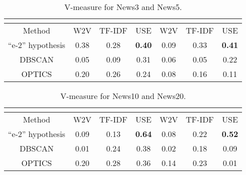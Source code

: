 \begin{table}[ht]%
	\centering
	\caption{V-measure for News3 and News5.}%
	\label{tab:vMeasure35}%
		\begin{tabular}{ c  c  c  c  c  c  c }%
			\toprule
			 & \multicolumn{3}{c}{\makecell{News3}} & \multicolumn{3}{c}{\makecell{News5}}\\
			\hline
			Method & W2V & TF-IDF & USE & W2V & TF-IDF & USE \\
			\hline
			“e-2” hypothesis & 0.38 & 0.28 & \textbf{0.40} & 0.09 & 0.33 & \textbf{0.41} \\
			DBSCAN & 0.05 & 0.09 & 0.31 & 0.06 & 0.05 & 0.22 \\
			OPTICS & 0.20 & 0.26 & 0.24 & 0.08 & 0.16 & 0.11 \\
			\bottomrule
		\end{tabular}%
\end{table}

\begin{table}[ht]%
	\centering
	\caption{V-measure for News10 and News20.}%
	\label{tab:vMeasure1020}%
		\begin{tabular}{ c  c  c  c  c  c  c }%
			\toprule
			& \multicolumn{3}{c}{\makecell{News3}} & \multicolumn{3}{c}{\makecell{News5}}\\
			\hline
			Method & W2V & TF-IDF & USE & W2V & TF-IDF & USE \\
			\hline
			“e-2” hypothesis & 0.09 & 0.13 & \textbf{0.64} & 0.08 & 0.22 & \textbf{0.52} \\
			DBSCAN & 0.01 & 0.24 & 0.38 & 0.02 & 0.18 & 0.09 \\
			OPTICS & 0.20 & 0.28 & 0.36 & 0.14 & 0.23 & 0.01 \\
			\bottomrule
		\end{tabular}%
\end{table}

